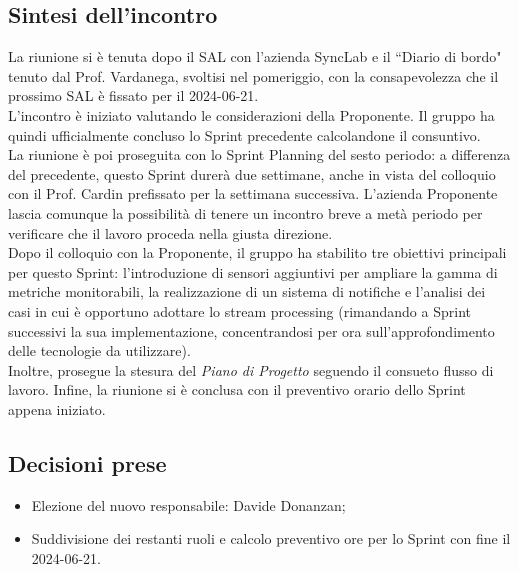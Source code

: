\documentclass[8pt]{article}
\begin{document}
\subsection{Sintesi dell'incontro}
La riunione si è tenuta dopo il SAL con l'azienda SyncLab e il ``Diario di bordo" tenuto dal Prof. Vardanega, svoltisi nel pomeriggio, con la
consapevolezza che il prossimo SAL è fissato per il 2024-06-21. \\ L'incontro è iniziato
valutando le considerazioni della Proponente. Il gruppo ha quindi ufficialmente concluso lo Sprint
precedente calcolandone il consuntivo. \\
La riunione è poi proseguita con lo Sprint Planning del sesto periodo: a differenza del precedente, questo Sprint durerà due
settimane, anche in vista del colloquio con il Prof. Cardin prefissato per la settimana successiva. L'azienda Proponente lascia comunque la possibilità di tenere un incontro breve a metà periodo per verificare che il lavoro proceda nella giusta direzione. \\
Dopo il colloquio con la Proponente, il gruppo ha stabilito tre obiettivi principali per questo Sprint: l'introduzione di sensori aggiuntivi per ampliare la gamma di metriche monitorabili, la realizzazione di un sistema di notifiche e
l'analisi dei casi in cui è opportuno adottare lo stream processing (rimandando a Sprint successivi la sua
implementazione, concentrandosi per ora sull'approfondimento delle tecnologie da utilizzare).
\\Inoltre, prosegue la stesura del \textit{Piano di Progetto} seguendo il consueto flusso di lavoro. Infine, la
riunione si è conclusa con il preventivo orario dello Sprint appena iniziato.
\subsection{Decisioni prese}
\begin{itemize}
	\setlength\itemsep{0em}
    \item Elezione del nuovo responsabile: Davide Donanzan;
    \item Suddivisione dei restanti ruoli e calcolo preventivo ore per lo Sprint con fine il
        2024-06-21.
\end{itemize}
\newpage
\end{document}

